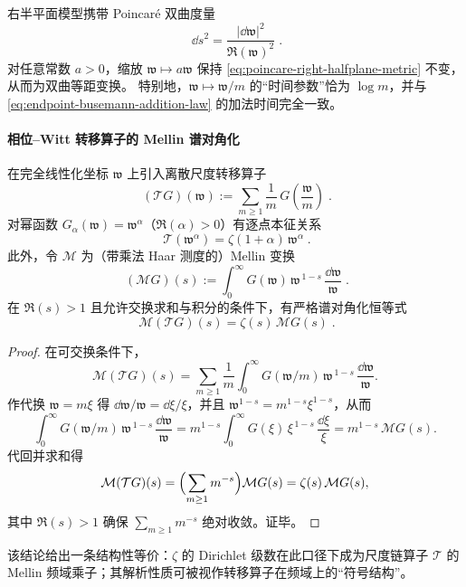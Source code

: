 \medskip
右半平面模型携带 Poincar{\'e} 双曲度量
\begin{equation}\label{eq:poincare-right-halfplane-metric}
\boxed{\;\dd s^{2}=\frac{|\dd \mathfrak{w}|^{2}}{\Re(\mathfrak{w})^{2}}\; }.
\end{equation}
对任意常数 \(a>0\)，缩放 \(\mathfrak{w}\mapsto a\mathfrak{w}\) 保持 \eqref{eq:poincare-right-halfplane-metric} 不变，从而为双曲等距变换。
特别地，\(\mathfrak{w}\mapsto \mathfrak{w}/m\) 的“时间参数”恰为 \(\log m\)，并与 \eqref{eq:endpoint-busemann-addition-law} 的加法时间完全一致。

\paragraph{相位--Witt 转移算子的 Mellin 谱对角化}
在完全线性化坐标 \(\mathfrak{w}\) 上引入离散尺度转移算子
\begin{equation}\label{eq:scale-transfer-operator}
\boxed{\;
(\mathcal{T}G)(\mathfrak{w})
:=\sum_{m\ge 1}\frac{1}{m}\,G\!\left(\frac{\mathfrak{w}}{m}\right)\; }.
\end{equation}
对幂函数 \(G_{\alpha}(\mathfrak{w})=\mathfrak{w}^{\alpha}\)（\(\Re(\alpha)>0\)）有逐点本征关系
\begin{equation}\label{eq:scale-transfer-eigen-monomial}
\boxed{\;
\mathcal{T}(\mathfrak{w}^{\alpha})=\zeta(1+\alpha)\,\mathfrak{w}^{\alpha}\; }.
\end{equation}
此外，令 \(\mathcal{M}\) 为（带乘法 Haar 测度的）Mellin 变换
\begin{equation}\label{eq:scale-mellin-transform}
\boxed{\;
(\mathcal{M}G)(s):=\int_{0}^{\infty} G(\mathfrak{w})\,\mathfrak{w}^{\,1-s}\,\frac{\dd \mathfrak{w}}{\mathfrak{w}}\; }.
\end{equation}
在 \(\Re(s)>1\) 且允许交换求和与积分的条件下，有严格谱对角化恒等式
\begin{equation}\label{eq:scale-mellin-diagonalization}
\boxed{\;\mathcal{M}(\mathcal{T}G)(s)=\zeta(s)\,\mathcal{M}G(s)\; }.
\end{equation}
\begin{proof}
在可交换条件下，
\[
\mathcal{M}(\mathcal{T}G)(s)
=\sum_{m\ge 1}\frac{1}{m}\int_{0}^{\infty}G(\mathfrak{w}/m)\,\mathfrak{w}^{\,1-s}\,\frac{\dd\mathfrak{w}}{\mathfrak{w}}.
\]
作代换 \(\mathfrak{w}=m\xi\) 得 \(\dd\mathfrak{w}/\mathfrak{w}=\dd\xi/\xi\)，并且 \(\mathfrak{w}^{1-s}=m^{1-s}\xi^{1-s}\)，从而
\[
\int_{0}^{\infty}G(\mathfrak{w}/m)\,\mathfrak{w}^{\,1-s}\,\frac{\dd\mathfrak{w}}{\mathfrak{w}}
=m^{1-s}\int_{0}^{\infty}G(\xi)\,\xi^{\,1-s}\,\frac{\dd\xi}{\xi}
=m^{1-s}\,\mathcal{M}G(s).
\]
代回并求和得
\[
\mathcal{M}(\mathcal{T}G)(s)
=\Bigl(\sum_{m\ge 1}m^{-s}\Bigr)\mathcal{M}G(s)
=\zeta(s)\,\mathcal{M}G(s),
\]
其中 \(\Re(s)>1\) 确保 \(\sum_{m\ge 1}m^{-s}\) 绝对收敛。证毕。
\end{proof}
该结论给出一条结构性等价：\(\zeta\) 的 Dirichlet 级数在此口径下成为尺度链算子 \(\mathcal{T}\) 的 Mellin 频域乘子；其解析性质可被视作转移算子在频域上的“符号结构”。

